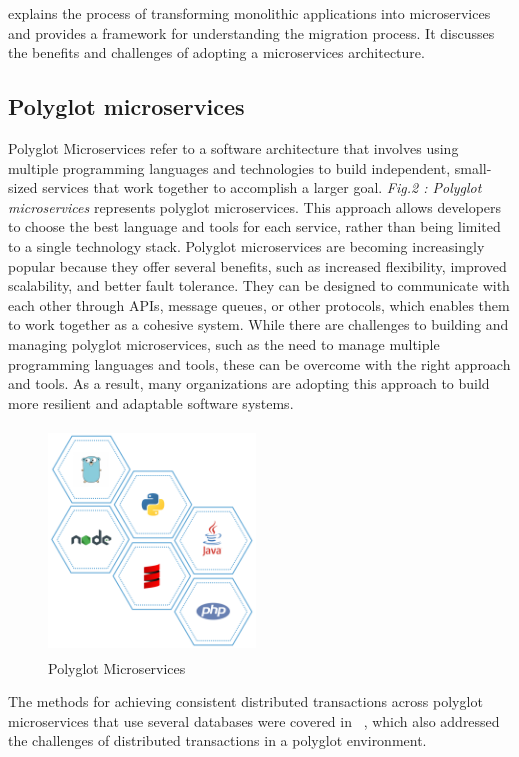 \cite{escobar2016towards}explains the process of transforming monolithic applications into microservices and provides a framework for understanding the migration process. It discusses the benefits and challenges of adopting a microservices architecture.

\subsection{ Polyglot microservices}
Polyglot Microservices refer to a software architecture that involves using multiple programming languages and technologies to build independent, small-sized services that work together to accomplish a larger goal. \emph{Fig.2 : Polyglot microservices} represents polyglot microservices. This approach allows developers to choose the best language and tools for each service, rather than being limited to a single technology stack. Polyglot microservices are becoming increasingly popular because they offer several benefits, such as increased flexibility, improved scalability, and better fault tolerance. They can be designed to communicate with each other through APIs, message queues, or other protocols, which enables them to work together as a cohesive system.
While there are challenges to building and managing polyglot microservices, such as the need to manage multiple programming languages and tools, these can be overcome with the right approach and tools. As a result, many organizations are adopting this approach to build more resilient and adaptable software systems.

\begin{figure}
\centering
\includegraphics[width=5.5cm, height=6cm]{polyglot_microservices}
\caption{Polyglot Microservices}
\end{figure}

The methods for achieving consistent distributed transactions across polyglot microservices that use several databases were covered in  ~\cite{zhang2019grit}, which also addressed the challenges of distributed transactions in a polyglot environment.

